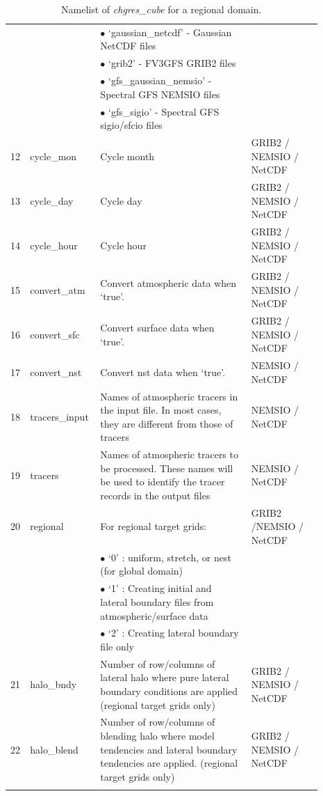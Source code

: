 \documentclass[11pt,fleqn]{report}              %
\begin{document}
{\begin{longtable}{p{0.02\linewidth} | p{0.18\linewidth} | p{0.47\linewidth} | p{0.22\linewidth}}
     & & $\bullet$ `gaussian\_netcdf' - Gaussian NetCDF files & \\
     & & $\bullet$ `grib2' - FV3GFS GRIB2 files & \\
     & & $\bullet$ `gfs\_gaussian\_nemsio' - Spectral GFS NEMSIO files &\\
     & & $\bullet$ `gfs\_sigio' - Spectral GFS sigio/sfcio files &\\
12 & cycle\_mon & Cycle month & GRIB2 / NEMSIO / NetCDF \\
13 & cycle\_day & Cycle day & GRIB2 / NEMSIO / NetCDF \\
14 & cycle\_hour & Cycle hour & GRIB2 / NEMSIO / NetCDF \\
15 & convert\_atm & Convert atmospheric data when `true'. & GRIB2 / NEMSIO / NetCDF \\
16 & convert\_sfc & Convert surface data when `true'. & GRIB2 / NEMSIO / NetCDF \\
17 & convert\_nst & Convert nst data when `true'. & NEMSIO / NetCDF \\
18 & tracers\_input & Names of atmospheric tracers in the input file. In most cases, they are different from those of tracers  & NEMSIO / NetCDF \\
19 & tracers & Names of atmospheric tracers to be processed. These names will be used to identify the tracer records in the output files & NEMSIO / NetCDF\\
20 & regional & For regional target grids: & GRIB2  /NEMSIO / NetCDF\\
    & & $\bullet$ `0' : uniform, stretch, or nest (for global domain) &\\
    & & $\bullet$ `1' : Creating initial and lateral boundary files from atmospheric/surface data &\\
    & & $\bullet$ `2' : Creating lateral boundary file only  &\\
21 & halo\_bndy & Number of row/columns of lateral halo where pure lateral boundary conditions are applied (regional target grids only) & GRIB2 / NEMSIO / NetCDF \\ 
22 & halo\_blend & Number of row/columns of blending halo where model tendencies and lateral boundary tendencies are applied. (regional target grids only) & GRIB2 / NEMSIO / NetCDF \\
\hline
\caption{Namelist of {\it chgres\_cube} for a regional domain.}
\label{table:chgres_namelist}
\end{longtable}
}
\end{document}
